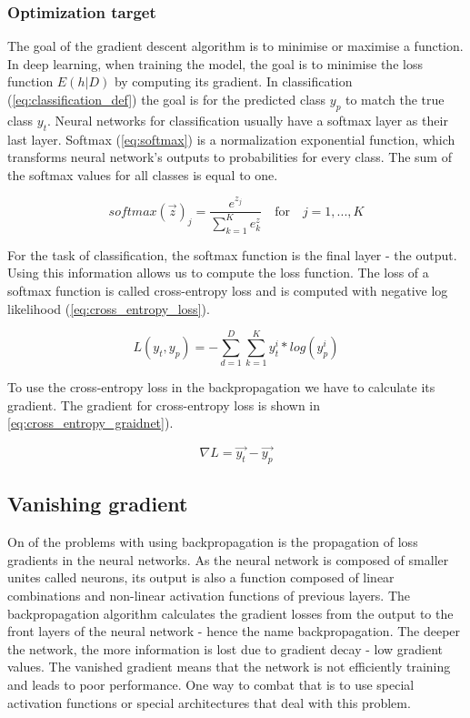 \documentclass[times, utf8, diplomski]{fer}
\begin{document}
\subsubsection{Optimization target}

The goal of the gradient descent algorithm is to minimise or maximise a function. In deep learning, when training the model, the goal is to minimise the loss function $E(h|D)$ by computing its gradient. In classification (\ref{eq:classification_def}) the goal is for the predicted class $y_p$ to match the true class $y_t$. Neural networks for classification usually have a softmax layer as their last layer. Softmax (\ref{eq:softmax}) is a normalization exponential function, which transforms neural network's outputs to probabilities for every class. The sum of the softmax values for all classes is equal to one.  

\begin{equation}
\label{eq:softmax}
    softmax(\vec{z})_j = \frac{e^{z_j}}{\displaystyle\sum_{k=1}^{K} e^{z}_k} \quad \text{for} \quad j = 1, ..., K
\end{equation} 

For the task of classification, the softmax function is the final layer - the output. Using this information allows us to compute the loss function. The loss of a softmax function is called cross-entropy loss and is computed with negative log likelihood (\ref{eq:cross_entropy_loss}).

\begin{equation}
\label{eq:cross_entropy_loss}
    L(y_t, y_p) = - \displaystyle\sum_{d=1}^{D} \sum_{k=1}^{K} y^i_t * log(y^i_p) 
\end{equation}

To use the cross-entropy loss in the backpropagation we have to calculate its gradient. The gradient for cross-entropy loss is shown in \ref{eq:cross_entropy_graidnet}).

\begin{equation}
\label{eq:cross_entropy_graidnet}
 \nabla{L} = \vec{y_t} - \vec{y_p}
\end{equation}

\subsection{Vanishing gradient}
\label{se:vanishing_gradient}

On of the problems with using backpropagation is the propagation of loss gradients in the neural networks. As the neural network is composed of smaller unites called neurons, its output is also a function composed of linear combinations and non-linear activation functions of previous layers. The backpropagation algorithm calculates the gradient losses from the output to the front layers of the neural network - hence the name backpropagation. The deeper the network, the more information is lost due to gradient decay - low gradient values. The vanished gradient means that the network is not efficiently training and leads to poor performance. One way to combat that is to use special activation functions \citep{clevert_fast_2015, xu_empirical_2015, he_delving_2015} or special architectures \citep{he_deep_2016} that deal with this problem. 
\end{document}
